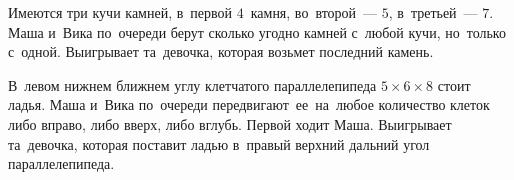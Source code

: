 \begin{problems}
\item
Имеются три кучи камней, в~первой $4$~камня, во~второй~--- $5$,
в~третьей~--- $7$.
Маша и~Вика по~очереди берут сколько угодно камней с~любой кучи, но~только
с~одной.
Выигрывает та~девочка, которая возьмет последний камень.

\item
В~левом нижнем ближнем углу клетчатого параллелепипеда $5 \times 6 \times 8$
стоит ладья.
Маша и~Вика по~очереди передвигают~ее~на~любое количество клеток либо вправо,
либо вверх, либо вглубь.
Первой ходит Маша.
Выигрывает та~девочка, которая поставит ладью в~правый верхний дальний угол
параллелепипеда.

\end{problems}

